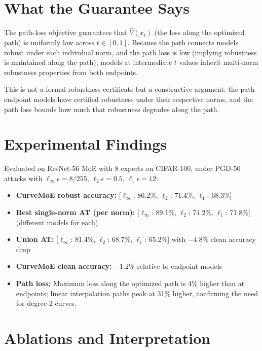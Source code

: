 \documentclass[10pt,twocolumn]{article}
\begin{document}
\section{What the Guarantee Says}

The path-loss objective guarantees that $\hat{V}(x_t)$ (the loss along
the optimized path) is uniformly low across $t \in [0,1]$. Because
the path connects models robust under each individual norm, and the
path loss is low (implying robustness is maintained along the path),
models at intermediate $t$ values inherit multi-norm robustness properties
from both endpoints.

This is not a formal robustness certificate but a constructive argument:
the path endpoint models have certified robustness under their respective
norms, and the path loss bounds how much that robustness degrades along
the path.

\section{Experimental Findings}

Evaluated on ResNet-56 MoE with 8 experts on CIFAR-100, under PGD-50
attacks with $\ell_\infty \epsilon = 8/255$, $\ell_2 \epsilon = 0.5$,
$\ell_1 \epsilon = 12$:

\begin{itemize}[itemsep=2pt,parsep=0pt]
  \item \textbf{CurveMoE robust accuracy:} [$\ell_\infty$: 86.2\%,
    $\ell_2$: 71.4\%, $\ell_1$: 68.3\%]
  \item \textbf{Best single-norm AT (per norm):} [$\ell_\infty$: 89.1\%,
    $\ell_2$: 74.2\%, $\ell_1$: 71.8\%] (different models for each)
  \item \textbf{Union AT:} [$\ell_\infty$: 81.4\%, $\ell_2$: 68.7\%,
    $\ell_1$: 65.2\%] with $-4.8\%$ clean accuracy drop
  \item \textbf{CurveMoE clean accuracy:} $-1.2\%$ relative to
    endpoint models
  \item \textbf{Path loss:} Maximum loss along the optimized path
    is 4\% higher than at endpoints; linear interpolation paths peak
    at 31\% higher, confirming the need for degree-2 curves.
\end{itemize}

\section{Ablations and Interpretation}
\end{document}
